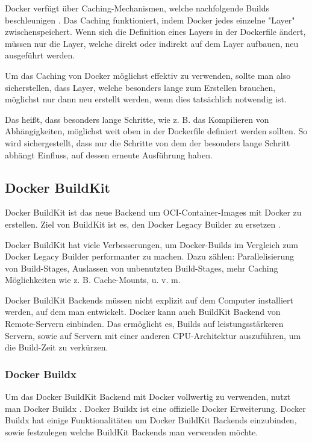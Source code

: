 Docker verfügt über Caching-Mechanismen, welche nachfolgende Builds beschleunigen \cite{dockerCache}. Das Caching funktioniert, indem Docker jedes einzelne "Layer" zwischenspeichert. Wenn sich die Definition eines Layers in der Dockerfile ändert, müssen nur die Layer, welche direkt oder indirekt auf dem Layer aufbauen, neu ausgeführt werden. 

Um das Caching von Docker möglichst effektiv zu verwenden, sollte man also sicherstellen, dass Layer, welche besonders lange zum Erstellen brauchen, möglichst nur dann neu erstellt werden, wenn dies tatsächlich notwendig ist.

Das heißt, dass besonders lange Schritte, wie z. B. das Kompilieren von Abhängigkeiten, möglichst weit oben in der Dockerfile definiert werden sollten. So wird sichergestellt, dass nur die Schritte von dem der besonders lange Schritt abhängt Einfluss, auf dessen erneute Ausführung haben.

\subsection{Docker BuildKit}

Docker BuildKit ist das neue Backend um OCI-Container-Images mit Docker zu erstellen. Ziel von BuildKit ist es, den Docker Legacy Builder zu ersetzen \cite{dockerBuildKit}.

Docker BuildKit hat viele Verbesserungen, um Docker-Builds im Vergleich zum Docker Legacy Builder performanter zu machen. Dazu zählen: Parallelisierung von Build-Stages, Auslassen von unbenutzten Build-Stages, mehr Caching Möglichkeiten wie z. B. Cache-Mounts, u. v. m.

Docker BuildKit Backends müssen nicht explizit auf dem Computer installiert werden, auf dem man entwickelt. Docker kann auch BuildKit Backend von Remote-Servern einbinden. Das ermöglicht es, Builds auf leistungsstärkeren Servern, sowie auf Servern mit einer anderen CPU-Architektur auszuführen, um die Build-Zeit zu verkürzen.

\subsubsection{Docker Buildx}

Um das Docker BuildKit Backend mit Docker vollwertig zu verwenden, nutzt man Docker Buildx \cite{dockerDockerBuildx}. Docker Buildx ist eine offizielle Docker Erweiterung. Docker Buildx hat einige Funktionalitäten um Docker BuildKit Backends einzubinden, sowie festzulegen welche BuildKit Backends man verwenden möchte.


